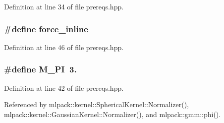 Definition at line 34 of file prereqs.\-hpp.

\subsubsection[{force\-\_\-inline}]{\setlength{\rightskip}{0pt plus 5cm}\#define force\-\_\-inline}\label{prereqs_8hpp_ae8c57c7218a376f10cbdf0e50f1189ee}


Definition at line 46 of file prereqs.\-hpp.

\subsubsection[{M\-\_\-\-P\-I}]{\setlength{\rightskip}{0pt plus 5cm}\#define M\-\_\-\-P\-I~3.}\label{prereqs_8hpp_ae71449b1cc6e6250b91f539153a7a0d3}


Definition at line 42 of file prereqs.\-hpp.



Referenced by mlpack\-::kernel\-::\-Spherical\-Kernel\-::\-Normalizer(), mlpack\-::kernel\-::\-Gaussian\-Kernel\-::\-Normalizer(), and mlpack\-::gmm\-::phi().


